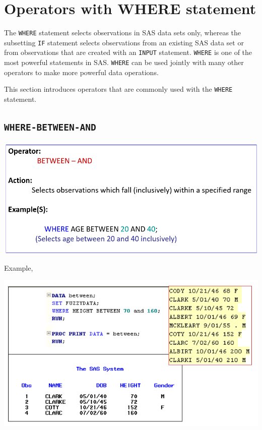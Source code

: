 \documentclass[
]{book}
\begin{document}
\hypertarget{operators-with-where-statement}{%
\section{Operators with WHERE statement}\label{operators-with-where-statement}}

The \texttt{WHERE} statement selects observations in SAS data sets only, whereas the subsetting \texttt{IF} statement selects observations from an existing SAS data set or from observations that are created with an \texttt{INPUT} statement. \texttt{WHERE} is one of the most powerful statements in SAS. \texttt{WHERE} can be used jointly with many other operators to make more powerful data operations.

This section introduces operators that are commonly used with the \texttt{WHERE} statement.

\hypertarget{where-between-and}{%
\subsection{\texorpdfstring{\texttt{WHERE-BETWEEN-AND}}{WHERE-BETWEEN-AND}}\label{where-between-and}}

\begin{center}\includegraphics[width=1\linewidth]{img09/w09-WHERE-BETWEEN-AND} \end{center}

Example,

\begin{center}\includegraphics[width=1\linewidth]{img09/w09-BETWEEN-AND-EXP} \end{center}
\end{document}
